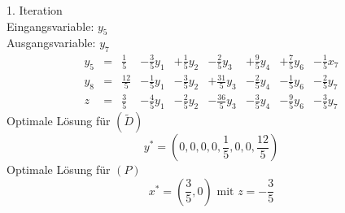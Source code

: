 \documentclass[a4paper]{scrartcl}
\begin{document}
\begin{enumerate}[label=\bfseries\arabic*.]
        1. Iteration \\
        Eingangsvariable: $y_5$ \\
        Ausgangsvariable: $y_7$
        \begin{equation}
            \begin{array}{rcrrrrrrr}
                y_5 & = & \frac{1}{5} & -\frac{3}{5}y_1 & +\frac{1}{5}y_2 & -\frac{2}{5}y_3 & +\frac{9}{5}y_4 & +\frac{7}{5}y_6 & -\frac{1}{5}x_7 \\
                y_8 & = & \frac{12}{5} & -\frac{1}{5}y_1 & -\frac{3}{5}y_2 & +\frac{31}{5}y_3 & -\frac{2}{5}y_4 & -\frac{1}{5}y_6 & -\frac{2}{5}y_7 \\
                \hline
                z & = & \frac{3}{5} & -\frac{4}{5}y_1 & -\frac{2}{5}y_2 & -\frac{36}{5}y_3 & -\frac{3}{5}y_4 & -\frac{9}{5}y_6 & -\frac{3}{5}y_7
            \end{array}
        \end{equation}
        Optimale Lösung für $(\tilde D)$ \\
        \begin{equation}
            y^* = \left( 0, 0, 0, 0, \frac{1}{5}, 0, 0, \frac{12}{5} \right)
        \end{equation}
        Optimale Lösung für $(P)$ \\
        \begin{equation}
            x^* = \left( \frac{3}{5}, 0 \right) \text{ mit } z = -\frac{3}{5}
        \end{equation}

\end{enumerate}
\end{document}
